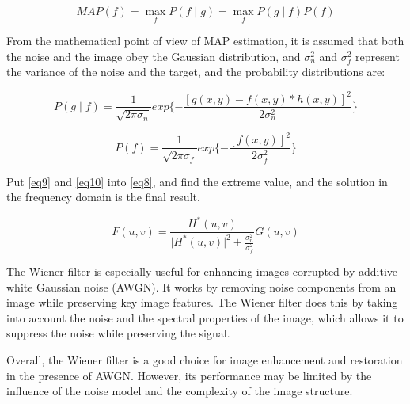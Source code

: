 \documentclass[conference]{IEEEtran}
\begin{document}
\begin{equation}
MAP(f) = \max_f P(f\mid g) = \max_f P(g\mid f)P(f)
\label{eq8}
\end{equation}

From the mathematical point of view of MAP estimation, it is assumed that both the noise and the image obey the Gaussian distribution, and $\sigma_n^2$ and $\sigma_f^2$ represent the variance of the noise and the target, and the probability distributions are:

\begin{equation}
P(g\mid f) = \frac{1}{\sqrt{2\pi \sigma_n}} exp\{-\frac{[g(x,y)-f(x,y)*h(x,y)]^2}{2\sigma_n^2} \} \label{eq9}
\end{equation}

\begin{equation}
P(f) = \frac{1}{\sqrt{2\pi \sigma_f}} exp\{-\frac{[f(x,y)]^2}{2\sigma_f^2} \} \label{eq10}
\end{equation}

Put \eqref{eq9} and \eqref{eq10} into \eqref{eq8}, and find the extreme value, and the solution in the frequency domain is the final result.

\begin{equation}
F(u,v) = \frac{H^*(u,v)}{\lvert H^*(u,v)\rvert^2 + \frac{\sigma_n^2}{\sigma_f^2}} G(u,v) \label{eq11}
\end{equation}

The Wiener filter is especially useful for enhancing images corrupted by additive white Gaussian noise (AWGN). It works by removing noise components from an image while preserving key image features. The Wiener filter does this by taking into account the noise and the spectral properties of the image, which allows it to suppress the noise while preserving the signal.

Overall, the Wiener filter is a good choice for image enhancement and restoration in the presence of AWGN. However, its performance may be limited by the influence of the noise model and the complexity of the image structure.

\end{document}
